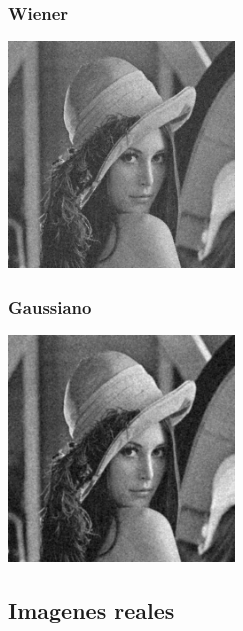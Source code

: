\documentclass{beamer}
\begin{document}
  \begin{frame}
    \frametitle{Wiener}
  
    \centering

    \includegraphics[width=6cm]{imgs/Comparacion/wiener_Lenna.jpg}
  
  \end{frame}


  \begin{frame}
    \frametitle{Gaussiano}
  
    \centering
    \includegraphics[width=6cm]{imgs/Comparacion/gaussian_Lenna.jpg}
  
  \end{frame}

  \subsection{Imagenes reales}
\end{document}
